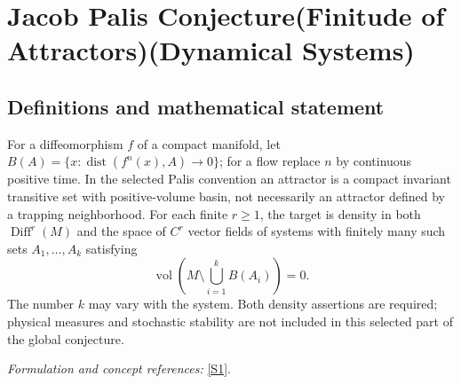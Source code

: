 \documentclass[11pt,a4paper]{article}
\newcommand{\sref}[2]{\hyperlink{source:#1:#2}{[S#2]}}
\newif\ifshowcatalogue
\newcommand{\cataloguescope}[1]{\ifshowcatalogue
 \paragraph{Exact scope in the supplied catalogue.}
 \begin{quote}\small #1\end{quote}\fi}
\begin{document}
\setcounter{section}{0}
\clearpage
\section*{\texorpdfstring{Jacob Palis Conjecture(Finitude of Attractors)(Dynamical Systems)}{Jacob Palis Conjecture(Finitude of Attractors)(Dynamical Systems)}}\label{3433}
\subsection{Definitions and mathematical statement}
For a diffeomorphism $f$ of a compact manifold, let
$B(A)=\{x:\operatorname{dist}(f^n(x),A)\to0\}$; for a flow replace $n$ by continuous positive time. In the selected Palis convention an attractor is a compact invariant transitive set with positive-volume basin, not necessarily an attractor defined by a trapping neighborhood. For each finite $r\ge1$, the target is density in both $\operatorname{Diff}^r(M)$ and the space of $C^r$ vector fields of systems with finitely many such sets $A_1,\ldots,A_k$ satisfying
\[
 \operatorname{vol}\left(M\setminus\bigcup_{i=1}^k B(A_i)\right)=0.
\]
The number $k$ may vary with the system. Both density assertions are required; physical measures and stochastic stability are not included in this selected part of the global conjecture.
\par\smallskip\textit{Formulation and concept references:} \sref{3433}{1}.
\cataloguescope{For every compact connected boundaryless smooth manifold M and every finite integer r >= 1, prove the conjunction of the following two density assertions: (i) in Diff\textasciicircum{}r(M) with its C\textasciicircum{}r topology there is a dense subset D whose elements f have finitely many attractors whose basins of attraction together cover M up to a set of smooth-volume measure zero; (ii) the same holds in the space X\textasciicircum{}r(M) of C\textasciicircum{}r vector fields with its C\textasciicircum{}r topology, for the attractors and basins of the generated flows. Attractor follows Palis (2005) Sections 2.1 and 2.3: a compact invariant set A that is transitive (has a dense orbit) and attracts a set of positive volume, its basin being the set of points whose forward orbit (or forward flow trajectory) converges to A. The finite number of attractors may depend on the element of D; no uniform bound is required. Volume-zero is independent of the choice of smooth positive density on M. This is the first bullet of Palis's Global Conjecture only; physical measures, stochastic stability, metric stability under parameter perturbation, and one-dimensional-family statements are separate conjectures not included.}
\end{document}

